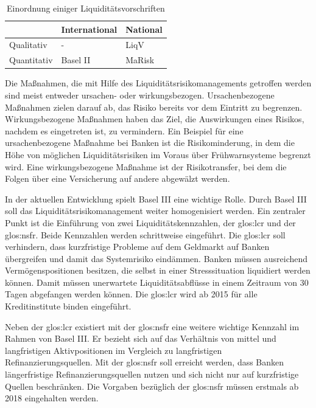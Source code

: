 \begin{onehalfspacing}
{
\setlength{\extrarowheight}{2pt}
\begin{table}[h]
\centering
\begin{tabular}{| l | >{\centering\arraybackslash} m{4cm} | >{\centering\arraybackslash} m{4cm} |}
\cline{2-3}
\multicolumn{1}{l|}{}	& International & National 		\\	\hline
Qualitativ 				& - 			& \gls{LiqV}	\\	\hline
Quantitativ 			& Basel II 		& \gls{MaRisk}	\\	\hline
\end{tabular} 
\caption{Einordnung einiger Liquiditätsvorschriften \label{table:einordnung}}
\end{table}
}

Die Maßnahmen, die mit Hilfe des Liquiditätsrisikomanagements getroffen werden sind meist entweder ursachen- oder wirkungsbezogen. Ursachenbezogene Maßnahmen zielen darauf ab, das Risiko bereits vor dem Eintritt zu begrenzen. Wirkungsbezogene Maßnahmen haben das Ziel, die Auswirkungen eines Risikos, nachdem es eingetreten ist, zu vermindern. Ein Beispiel für eine ursachenbezogene Maßnahme bei Banken ist die Risikominderung, in dem die Höhe von möglichen Liquiditätsrisiken im Voraus über Frühwarnsysteme begrenzt wird. Eine wirkungsbezogene Maßnahme ist der Risikotransfer, bei dem die Folgen über eine Versicherung auf andere abgewälzt werden.


In der aktuellen Entwicklung spielt Basel III eine wichtige Rolle. Durch Basel III soll das Liquiditätsrisikomanagement weiter homogenisiert werden. Ein zentraler Punkt ist die Einführung von zwei Liquiditätskennzahlen, der \gls{glos:lcr} und der \gls{glos:nsfr}. Beide Kennzahlen werden schrittweise eingeführt. Die \gls{glos:lcr} soll verhindern, dass kurzfristige Probleme auf dem Geldmarkt auf Banken übergreifen und damit das Systemrisiko eindämmen. Banken müssen ausreichend Vermögenspositionen besitzen, die selbst in einer Stresssituation liquidiert werden können. Damit müssen unerwartete Liquiditätsabflüsse in einem Zeitraum von 30 Tagen abgefangen werden können. Die \gls{glos:lcr} wird ab 2015 für alle Kreditinstitute binden eingeführt.

Neben der \gls{glos:lcr} existiert mit der \gls{glos:nsfr} eine weitere wichtige Kennzahl im Rahmen von Basel III. Er bezieht sich auf das Verhältnis von mittel und langfristigen Aktivpositionen im Vergleich zu langfristigen Refinanzierungsquellen. Mit der \gls{glos:nsfr} soll erreicht werden, dass Banken längerfristige Refinanzierungsquellen nutzen und sich nicht nur auf kurzfristige Quellen beschränken. Die Vorgaben bezüglich der \gls{glos:nsfr} müssen erstmals ab 2018 eingehalten werden.


\end{onehalfspacing}

